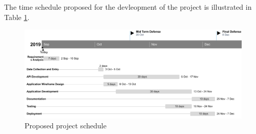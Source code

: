 \documentclass[12pt, a4paper, oneside]{article}
\begin{document}
The time schedule proposed for the devleopment of the project is illustrated in Table \ref{fig:schedule}.

\begin{figure}[h!]
	\includegraphics[width=\linewidth]{schedule}
	\centering
	\caption{Proposed project schedule}
	\label{fig:schedule}
\end{figure}



\break
{}


\end{document}
